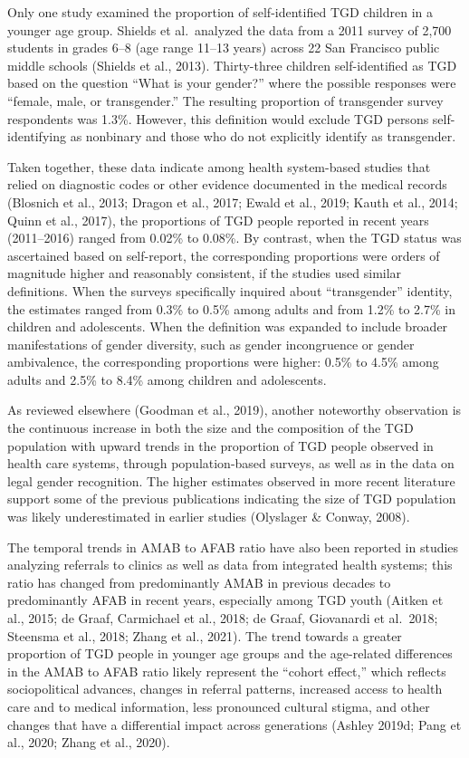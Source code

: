 \documentclass[
]{book}
\begin{document}
Only one study examined the proportion of
self-identified TGD children in a younger age
group. Shields et al.~analyzed the data from a
2011 survey of 2,700 students in grades 6--8 (age
range 11--13 years) across 22 San Francisco public
middle schools (Shields et al., 2013). Thirty-three
children self-identified as TGD based on the
question ``What is your gender?'' where the possible responses were ``female, male, or transgender.'' The resulting proportion of transgender
survey respondents was 1.3\%. However, this definition would exclude TGD persons self-identifying
as nonbinary and those who do not explicitly
identify as transgender.

Taken together, these data indicate among
health system-based studies that relied on diagnostic codes or other evidence documented in
the medical records (Blosnich et al., 2013; Dragon
et al., 2017; Ewald et al., 2019; Kauth et al., 2014;
Quinn et al., 2017), the proportions of TGD people reported in recent years (2011--2016) ranged
from 0.02\% to 0.08\%. By contrast, when the TGD
status was ascertained based on self-report, the
corresponding proportions were orders of magnitude higher and reasonably consistent, if the
studies used similar definitions. When the surveys specifically inquired about ``transgender''
identity, the estimates ranged from 0.3\% to 0.5\%
among adults and from 1.2\% to 2.7\% in children
and adolescents. When the definition was
expanded to include broader manifestations of
gender diversity, such as gender incongruence or
gender ambivalence, the corresponding proportions were higher: 0.5\% to 4.5\% among adults
and 2.5\% to 8.4\% among children and
adolescents.

As reviewed elsewhere (Goodman et al., 2019),
another noteworthy observation is the continuous
increase in both the size and the composition of
the TGD population with upward trends in the
proportion of TGD people observed in health
care systems, through population-based surveys,
as well as in the data on legal gender recognition.
The higher estimates observed in more recent
literature support some of the previous publications indicating the size of TGD population was
likely underestimated in earlier studies (Olyslager
\& Conway, 2008).

The temporal trends in AMAB to AFAB ratio
have also been reported in studies analyzing
referrals to clinics as well as data from integrated
health systems; this ratio has changed from predominantly AMAB in previous decades to predominantly AFAB in recent years, especially
among TGD youth (Aitken et al., 2015; de Graaf,
Carmichael et al., 2018; de Graaf, Giovanardi
et al.~2018; Steensma et al., 2018; Zhang et al.,
2021). The trend towards a greater proportion of
TGD people in younger age groups and the
age-related differences in the AMAB to AFAB
ratio likely represent the ``cohort effect,'' which
reflects sociopolitical advances, changes in referral
patterns, increased access to health care and to
medical information, less pronounced cultural
stigma, and other changes that have a differential
impact across generations (Ashley 2019d; Pang
et al., 2020; Zhang et al., 2020).
\end{document}
